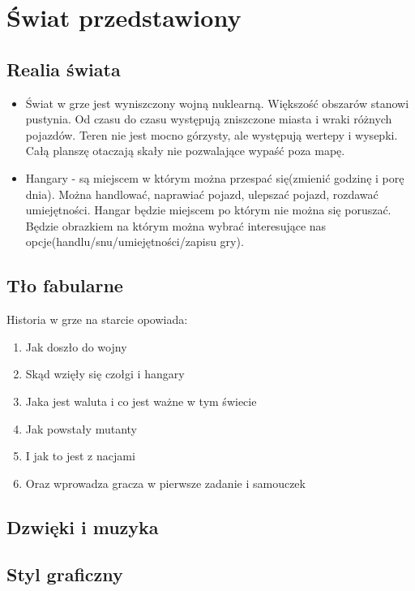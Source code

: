 \documentclass{article}
\begin{document}
    \newpage
    
   
\section{Świat przedstawiony}
    \subsection{Realia świata}
    \begin{itemize}
 

    \item Świat w grze jest wyniszczony wojną nuklearną. Większość obszarów stanowi pustynia. Od czasu do czasu występują zniszczone miasta i wraki różnych pojazdów. Teren nie jest mocno górzysty, ale występują wertepy i wysepki. Całą planszę otaczają skały nie pozwalające wypaść poza mapę. 
\item Hangary - są miejscem w którym można przespać się(zmienić godzinę i porę dnia). Można handlować, naprawiać pojazd, ulepszać pojazd, rozdawać umiejętności. Hangar będzie miejscem po którym nie można się poruszać. Będzie obrazkiem na którym można wybrać interesujące nas opcje(handlu/snu/umiejętności/zapisu gry).
    \end{itemize}
    \subsection{Tło fabularne}
    Historia w grze na starcie opowiada: 
    \begin{enumerate}
        \item Jak doszło do wojny
        \item Skąd wzięły się czołgi i hangary
        \item Jaka jest waluta i co jest ważne w tym świecie
        \item Jak powstały mutanty
        \item I jak to jest z nacjami
        \item Oraz wprowadza gracza w pierwsze zadanie i samouczek
    \end{enumerate}
    \subsection{Dzwięki i muzyka}
    
    
    \subsection{Styl graficzny}
    
\end{document}
